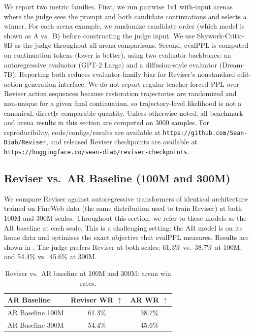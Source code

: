 \documentclass[11pt]{article}
\begin{document}
We report two metric families. First, we run pairwise 1v1 with-input arenas where the judge sees the prompt and both candidate continuations and selects a winner. For each arena example, we randomize candidate order (which model is shown as A vs.\ B) before constructing the judge input. We use Skywork-Critic-8B \citep{skywork2024critic} as the judge throughout all arena comparisons. Second, evalPPL is computed on continuation tokens (lower is better), using two evaluator backbones: an autoregressive evaluator (GPT-2 Large) and a diffusion-style evaluator (Dream-7B). Reporting both reduces evaluator-family bias for Reviser's nonstandard edit-action generation interface. We do not report regular teacher-forced PPL over Reviser action sequences because restoration trajectories are randomized and non-unique for a given final continuation, so trajectory-level likelihood is not a canonical, directly comparable quantity. Unless otherwise noted, all benchmark and arena results in this section are computed on 3000 samples.
For reproducibility, code/configs/results are available at \texttt{https://github.com/Sean-Diab/Reviser}, and released Reviser checkpoints are available at \texttt{https://huggingface.co/sean-diab/reviser-checkpoints}.

\subsection{Reviser vs.\ AR Baseline (100M and 300M)}
\label{sec:ar_baseline_matched}

We compare Reviser against autoregressive transformers of identical architecture trained on FineWeb data (the same distribution used to train Reviser) at both 100M and 300M scales. Throughout this section, we refer to these models as the AR baseline at each scale. This is a challenging setting: the AR model is on its home data and optimises the exact objective that evalPPL measures. Results are shown in . The judge prefers Reviser at both scales: \num{61.3}\% vs.\ \num{38.7}\% at 100M, and \num{54.4}\% vs.\ \num{45.6}\% at 300M.

\begin{table}[tbp]
\centering
\small
\setlength{\tabcolsep}{5pt}
\begin{tabular}{lcc}
\toprule
AR Baseline & Reviser WR $\uparrow$ & AR WR $\uparrow$ \\
\midrule
AR Baseline 100M & \num{61.3}\% & \num{38.7}\% \\
AR Baseline 300M & \num{54.4}\% & \num{45.6}\% \\
\bottomrule
\end{tabular}
\caption{Reviser vs.\ AR baseline at 100M and 300M: arena win rates.}
\label{tab:arena_vs_ar_baseline}
\end{table}
\end{document}
